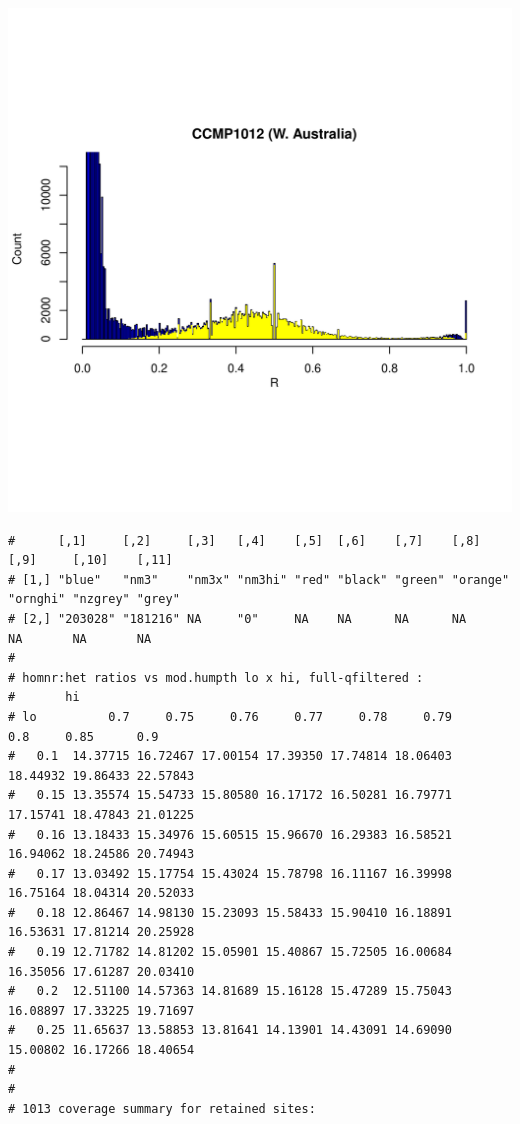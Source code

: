 \documentclass{article}\usepackage[]{graphicx}\usepackage[]{color}
\makeatletter
\def\maxwidth{ %
  \ifdim\Gin@nat@width>\linewidth
    \linewidth
  \else
    \Gin@nat@width
  \fi
}
\newenvironment{kframe}{%
 \def\at@end@of@kframe{}%
 \ifinner\ifhmode%
  \def\at@end@of@kframe{\end{minipage}}%
  \begin{minipage}{\columnwidth}%
 \fi\fi%
 \def\FrameCommand##1{\hskip\@totalleftmargin \hskip-\fboxsep
 \colorbox{shadecolor}{##1}\hskip-\fboxsep
     \hskip-\linewidth \hskip-\@totalleftmargin \hskip\columnwidth}%
 \MakeFramed {\advance\hsize-\width
   \@totalleftmargin\z@ \linewidth\hsize
   \@setminipage}}%
 {\par\unskip\endMakeFramed%
 \at@end@of@kframe}
\newenvironment{knitrout}{}{} %
\makeatother
\begin{document}
\begin{knitrout}
\includegraphics[width=\maxwidth]{FigS7-hwe-histo-figs-knitr/unnamed-chunk-10-31} 
\begin{kframe}\begin{verbatim}
#      [,1]     [,2]     [,3]   [,4]    [,5]  [,6]    [,7]    [,8]     [,9]     [,10]    [,11] 
# [1,] "blue"   "nm3"    "nm3x" "nm3hi" "red" "black" "green" "orange" "ornghi" "nzgrey" "grey"
# [2,] "203028" "181216" NA     "0"     NA    NA      NA      NA       NA       NA       NA
# 
# homnr:het ratios vs mod.humpth lo x hi, full-qfiltered :
#       hi
# lo          0.7     0.75     0.76     0.77     0.78     0.79      0.8     0.85      0.9
#   0.1  14.37715 16.72467 17.00154 17.39350 17.74814 18.06403 18.44932 19.86433 22.57843
#   0.15 13.35574 15.54733 15.80580 16.17172 16.50281 16.79771 17.15741 18.47843 21.01225
#   0.16 13.18433 15.34976 15.60515 15.96670 16.29383 16.58521 16.94062 18.24586 20.74943
#   0.17 13.03492 15.17754 15.43024 15.78798 16.11167 16.39998 16.75164 18.04314 20.52033
#   0.18 12.86467 14.98130 15.23093 15.58433 15.90410 16.18891 16.53631 17.81214 20.25928
#   0.19 12.71782 14.81202 15.05901 15.40867 15.72505 16.00684 16.35056 17.61287 20.03410
#   0.2  12.51100 14.57363 14.81689 15.16128 15.47289 15.75043 16.08897 17.33225 19.71697
#   0.25 11.65637 13.58853 13.81641 14.13901 14.43091 14.69090 15.00802 16.17266 18.40654
# 
# 
# 1013 coverage summary for retained sites:

\end{verbatim}
\end{kframe}
\end{knitrout}
\end{document}
